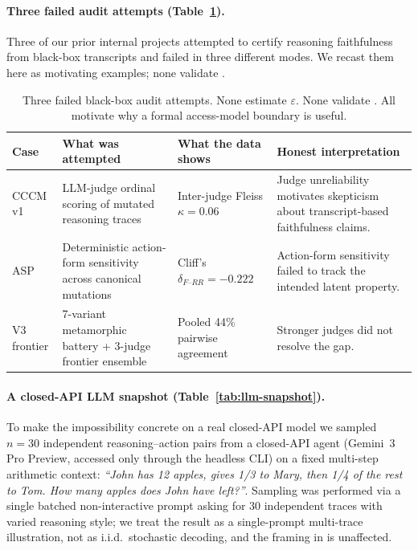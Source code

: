 \documentclass{article}
\theoremstyle{plain}
\theoremstyle{definition}
\theoremstyle{remark}
\begin{document}
\paragraph{Three failed audit attempts (Table~\ref{tab:empirical-fails}).}
Three of our prior internal projects attempted to certify reasoning
faithfulness from black-box transcripts and failed in three different
modes. We recast them here as motivating examples; none validate
.

\begin{table}[h]
\centering\small
\begin{tabular}{p{1.5cm}p{3.5cm}p{3.5cm}p{4cm}}
\toprule
Case & What was attempted & What the data shows & Honest interpretation \\
\midrule
CCCM v1 & LLM-judge ordinal scoring of mutated reasoning traces &
  Inter-judge Fleiss $\kappa = 0.06$ &
  Judge unreliability motivates skepticism about transcript-based faithfulness claims. \\
ASP & Deterministic action-form sensitivity across canonical mutations &
  Cliff's $\delta_{F\text{--}RR} = -0.222$ &
  Action-form sensitivity failed to track the intended latent property. \\
V3 frontier & 7-variant metamorphic battery + 3-judge frontier ensemble &
  Pooled 44\% pairwise agreement &
  Stronger judges did not resolve the gap. \\
\bottomrule
\end{tabular}
\caption{Three failed black-box audit attempts. None estimate $\varepsilon$.
None validate . All motivate why a formal
access-model boundary is useful.}
\label{tab:empirical-fails}
\end{table}

\paragraph{A closed-API LLM snapshot (Table~\ref{tab:llm-snapshot}).}
To make the impossibility concrete on a real closed-API model we sampled
$n = 30$ independent reasoning--action pairs from a closed-API agent
(Gemini~3 Pro Preview, accessed only through the headless CLI) on a fixed
multi-step arithmetic context: \emph{``John has 12 apples, gives 1/3 to Mary,
then 1/4 of the rest to Tom. How many apples does John have left?''}. Sampling
was performed via a single batched non-interactive prompt asking for 30
independent traces with varied reasoning style; we treat the result as a
single-prompt multi-trace illustration, not as i.i.d.\ stochastic decoding,
and the framing in  is unaffected.
\end{document}
